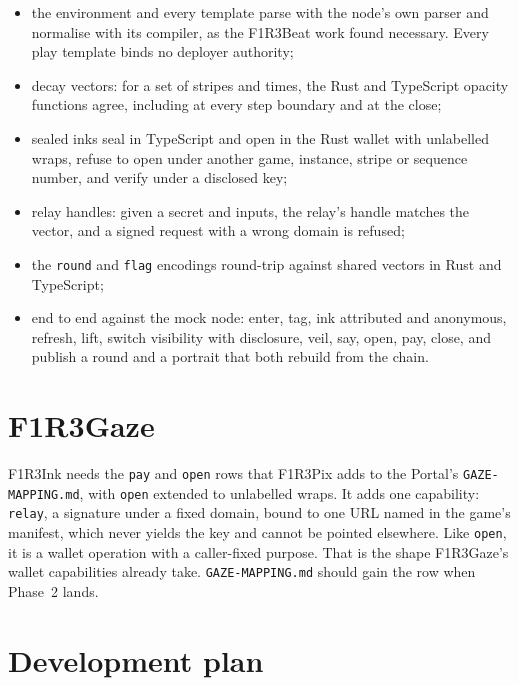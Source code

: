 \documentclass[11pt,a4paper]{article}
\newcommand{\code}[1]{\texttt{#1}}
\newcounter{req}
\begin{document}
\begin{itemize}[leftmargin=1.2em,itemsep=1pt]
\item the environment and every template parse with the node's own parser and normalise with
  its compiler, as the F1R3Beat work found necessary. Every play template binds no deployer
  authority;
\item decay vectors: for a set of stripes and times, the Rust and TypeScript opacity functions
  agree, including at every step boundary and at the close;
\item sealed inks seal in TypeScript and open in the Rust wallet with unlabelled wraps, refuse
  to open under another game, instance, stripe or sequence number, and verify under a
  disclosed key;
\item relay handles: given a secret and inputs, the relay's handle matches the vector, and a
  signed request with a wrong domain is refused;
\item the \code{round} and \code{flag} encodings round-trip against shared vectors in Rust and
  TypeScript;
\item end to end against the mock node: enter, tag, ink attributed and anonymous, refresh, lift,
  switch visibility with disclosure, veil, say, open, pay, close, and publish a round and a
  portrait that both rebuild from the chain.
\end{itemize}

\section{F1R3Gaze}\label{sec:gaze}

F1R3Ink needs the \code{pay} and \code{open} rows that F1R3Pix adds to the Portal's
\code{GAZE-MAPPING.md}, with \code{open} extended to unlabelled wraps. It adds one capability:
\code{relay}, a signature under a fixed domain, bound to one URL named in the game's manifest,
which never yields the key and cannot be pointed elsewhere. Like \code{open}, it is a wallet
operation with a caller-fixed purpose. That is the shape F1R3Gaze's wallet capabilities already
take. \code{GAZE-MAPPING.md} should gain the row when Phase~2 lands.

\section{Development plan}\label{sec:plan}
\end{document}
